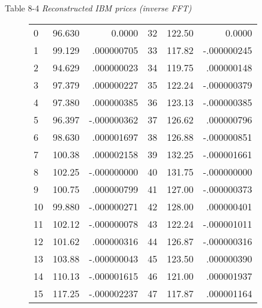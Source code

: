 Table 8-4 \textit{Reconstructed IBM prices (inverse FFT)}
\begin{figure}
    \setlength{\tabcolsep}{1em}
    \begin{tabular}{lrrlrr}
         0 &  96.630 &  0.0000     & 32 &  122.50 &  0.0000     \\
         1 &  99.129 &  .000000705 & 33 &  117.82 & -.000000245 \\
         2 &  94.629 &  .000000023 & 34 &  119.75 &  .000000148 \\
         3 &  97.379 &  .000000227 & 35 &  122.24 & -.000000379 \\
         4 &  97.380 &  .000000385 & 36 &  123.13 & -.000000385 \\
         5 &  96.397 & -.000000362 & 37 &  126.62 &  .000000796 \\
         6 &  98.630 &  .000001697 & 38 &  126.88 & -.000000851 \\
         7 &  100.38 &  .000002158 & 39 &  132.25 & -.000001661 \\
         8 &  102.25 & -.000000000 & 40 &  131.75 & -.000000000 \\
         9 &  100.75 &  .000000799 & 41 &  127.00 & -.000000373 \\
        10 &  99.880 & -.000000271 & 42 &  128.00 &  .000000401 \\
        11 &  102.12 & -.000000078 & 43 &  122.24 & -.000001011 \\
        12 &  101.62 &  .000000316 & 44 &  126.87 & -.000000316 \\
        13 &  103.88 & -.000000043 & 45 &  123.50 &  .000000390 \\
        14 &  110.13 & -.000001615 & 46 &  121.00 &  .000001937 \\
        15 &  117.25 & -.000002237 & 47 &  117.87 &  .000001164 \\
        

\end{tabular}
\end{figure}
